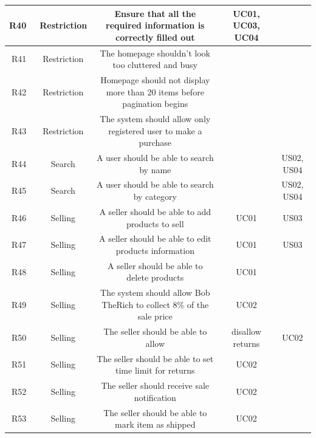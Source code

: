 \documentclass[11pt]{article}
\newcounter{use case ID}
\newcounter{req ID}
\begin{document}
\begin{table}[htbp]
\begin{center}
\begin{tabular}{|r | c| c | c| c|}
                            \hline
                            R40 & \ Restriction & Ensure that all the required information is correctly filled out & UC01, UC03, UC04 &  \\
                            \hline
                            R41 & \ Restriction & The homepage shouldn't look too cluttered and busy & &  \\
                            \hline
                            R42 & \ Restriction & Homepage should not display more than 20 items before pagination begins & &  \\
                            \hline
                            R43 & \ Restriction & The system should allow only registered user to make a purchase & &  \\
                            \hline
                            R44 & \ Search & A user should be able to search by name & & US02, US04 \\ 
                            \hline
                            R45 & \ Search & A user should be able to search by category & & US02, US04 \\ 
                             \hline
                            R46 & \ Selling & A seller should be able to add products to sell & UC01 & US03 \\
                            \hline
                            R47 & \ Selling & A seller should be able to edit products information & UC01 & US03 \\ 
                            \hline
                            R48 & \ Selling & A seller should be able to delete products & UC01 &  \\ 
                            \hline
                            R49 & \ Selling & The system should allow Bob TheRich to collect 8\% of the sale price & UC02 &  \\
                            \hline
                            R50 & \ Selling & The seller should be able to allow & disallow returns & UC02 &  \\
                            \hline
                            R51 & \ Selling & The seller should be able to set time limit for returns & UC02 &  \\
                            \hline
                            R52 & \ Selling & The seller should receive sale notification & UC02 &  \\
                            \hline
                            R53 & \ Selling & The seller should be able to mark item as shipped & UC02 &  \\

                            \hline
                        \end{tabular}
                    \end{center}
                \end{table}
\clearpage
\end{document}
